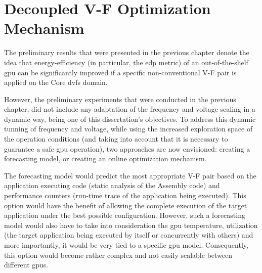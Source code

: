 
\chapter{Decoupled V-F Optimization Mechanism}
\label{chapter:mech}


The preliminary results that were presented in the previous chapter denote the idea that energy-efficiency (in particular, the \acrshort{edp} metric) of an out-of-the-shelf \acrshort{gpu} can be significantly improved if a specific non-conventional V-F pair is applied on the Core \acrshort{dvfs} domain. 

However, the preliminary experiments that were conducted in the previous chapter, did not include any adaptation of the frequency and voltage scaling in a dynamic way, being one of this dissertation's objectives.
To address this dynamic tunning of frequency and voltage, while using the increased exploration space of the operation conditions (and taking into account that it is necessary to guarantee a safe \acrshort{gpu} operation), two approaches are now envisioned: creating a forecasting model, or creating an online optimization mechanism.

The forecasting model would predict the most appropriate V-F pair based on the application executing code (static analysis of the Assembly code) and performance counters (run-time trace of the application being executed). This option would have the benefit of allowing the complete execution of the target application under the best possible configuration. However, such a forecasting model would also have to take into consideration the \acrshort{gpu} temperature, utilization (the target application being executed by itself or concurrently with others) and more importantly, it would be very tied to a specific \acrshort{gpu} model. Consequently, this option would become rather complex and not easily scalable between different \acrshort{gpu}s.

